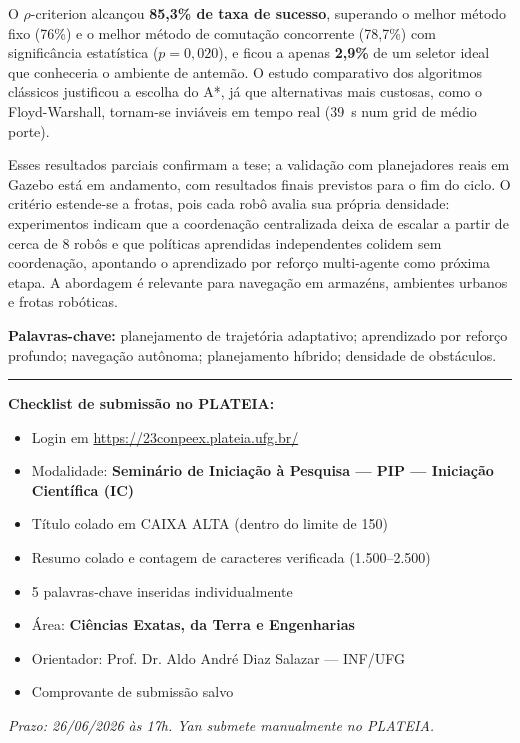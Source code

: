 \documentclass[12pt, a4paper]{article}
\begin{document}
O $\rho$-criterion alcançou \textbf{85,3\% de taxa de sucesso}, superando o melhor método fixo
(76\%) e o melhor método de comutação concorrente (78,7\%) com significância estatística
($p = 0{,}020$), e ficou a apenas \textbf{2,9\%} de um seletor ideal que conheceria o
ambiente de antemão. O estudo comparativo dos algoritmos
clássicos justificou a escolha do A*, já que alternativas mais custosas, como o
Floyd-Warshall, tornam-se inviáveis em tempo real (39~s num grid de médio porte).

Esses resultados parciais confirmam a tese; a validação com planejadores reais em Gazebo está
em andamento, com resultados finais previstos para o fim do ciclo. O critério estende-se a
frotas, pois cada robô avalia sua própria densidade: experimentos indicam que a coordenação
centralizada deixa de escalar a partir de cerca de 8 robôs e que políticas aprendidas
independentes colidem sem coordenação, apontando o aprendizado por reforço multi-agente como
próxima etapa. A abordagem é relevante para navegação em armazéns, ambientes urbanos e frotas
robóticas.

\vspace{0.4cm}
\noindent\textbf{Palavras-chave:} planejamento de trajetória adaptativo; aprendizado por
reforço profundo; navegação autônoma; planejamento híbrido; densidade de obstáculos.

\vspace{0.3cm}
\noindent\rule{\linewidth}{0.4pt}

\vspace{0.3cm}
\noindent\textbf{Checklist de submissão no PLATEIA:}

\begin{itemize}
  \item[$\square$] Login em \url{https://23conpeex.plateia.ufg.br/}
  \item[$\square$] Modalidade: \textbf{Seminário de Iniciação à Pesquisa --- PIP --- Iniciação Científica (IC)}
  \item[$\square$] Título colado em CAIXA ALTA (dentro do limite de 150)
  \item[$\square$] Resumo colado e contagem de caracteres verificada (1.500--2.500)
  \item[$\square$] 5 palavras-chave inseridas individualmente
  \item[$\square$] Área: \textbf{Ciências Exatas, da Terra e Engenharias}
  \item[$\square$] Orientador: Prof. Dr. Aldo André Diaz Salazar --- INF/UFG
  \item[$\square$] Comprovante de submissão salvo
\end{itemize}

\vfill
\noindent\small\textit{Prazo: 26/06/2026 às 17h. Yan submete manualmente no PLATEIA.}
\end{document}
